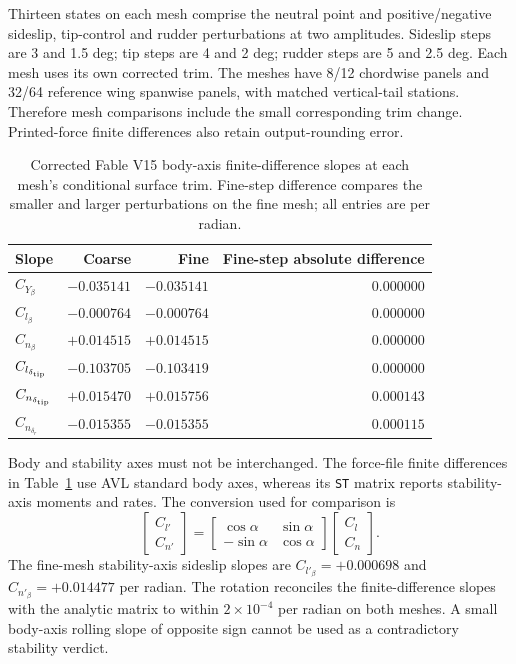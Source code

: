 Thirteen states on each mesh comprise the neutral point and positive/negative
sideslip, tip-control and rudder perturbations at two amplitudes. Sideslip
steps are 3 and 1.5 deg; tip steps are 4 and 2 deg; rudder steps are 5 and
2.5 deg. Each mesh uses its own corrected trim. The meshes have 8/12 chordwise
panels and 32/64 reference wing spanwise panels, with matched vertical-tail
stations. Therefore mesh comparisons include the small corresponding trim
change. Printed-force finite differences also retain output-rounding error.

\begin{table}[p]\centering\small
\caption{Corrected Fable V15 body-axis finite-difference slopes at each mesh's conditional surface trim. Fine-step difference compares the smaller and larger perturbations on the fine mesh; all entries are per radian.}
\label{tab:v15-fable-lateral}
\begin{tabular}{lrrr}\toprule
Slope & Coarse & Fine & Fine-step absolute difference\\\midrule
$C_{Y_\beta}$ & $-0.035141$ & $-0.035141$ & $0.000000$\\
$C_{l_\beta}$ & $-0.000764$ & $-0.000764$ & $0.000000$\\
$C_{n_\beta}$ & $+0.014515$ & $+0.014515$ & $0.000000$\\
$C_{l_{\delta_{\rm tip}}}$ & $-0.103705$ & $-0.103419$ & $0.000000$\\
$C_{n_{\delta_{\rm tip}}}$ & $+0.015470$ & $+0.015756$ & $0.000143$\\
$C_{n_{\delta_r}}$ & $-0.015355$ & $-0.015355$ & $0.000115$\\
\bottomrule\end{tabular}\end{table}

Body and stability axes must not be interchanged. The force-file finite
differences in Table~\ref{tab:v15-fable-lateral} use AVL standard body axes,
whereas its \texttt{ST} matrix reports stability-axis moments and rates.
The conversion used for comparison is
\begin{equation}
\begin{bmatrix}C_{l'}\\C_{n'}\end{bmatrix}=
\begin{bmatrix}\cos\alpha&\sin\alpha\\-\sin\alpha&\cos\alpha\end{bmatrix}
\begin{bmatrix}C_l\\C_n\end{bmatrix}.
\end{equation}
The fine-mesh stability-axis sideslip slopes are $C_{l'_\beta}=+0.000698$ and $C_{n'_\beta}=+0.014477$ per radian. The rotation reconciles the finite-difference slopes with the analytic matrix to within $2\times10^{-4}$ per radian on both meshes. A small body-axis rolling slope of opposite sign cannot be used as a contradictory stability verdict.

